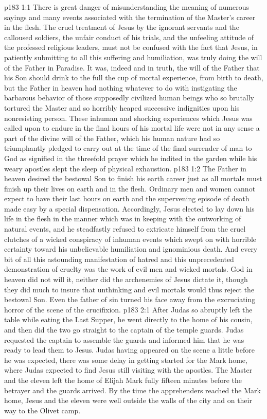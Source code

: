 \vs p183 1:1 There is great danger of misunderstanding the meaning of numerous sayings and many events associated with the termination of the Master’s career in the flesh. The cruel treatment of Jesus by the ignorant servants and the calloused soldiers, the unfair conduct of his trials, and the unfeeling attitude of the professed religious leaders, must not be confused with the fact that Jesus, in patiently submitting to all this suffering and humiliation, was truly doing the will of the Father in Paradise. It was, indeed and in truth, the will of the Father that his Son should drink to the full the cup of mortal experience, from birth to death, but the Father in heaven had nothing whatever to do with instigating the barbarous behavior of those supposedly civilized human beings who so brutally tortured the Master and so horribly heaped successive indignities upon his nonresisting person. These inhuman and shocking experiences which Jesus was called upon to endure in the final hours of his mortal life were not in any sense a part of the divine will of the Father, which his human nature had so triumphantly pledged to carry out at the time of the final surrender of man to God as signified in the threefold prayer which he indited in the garden while his weary apostles slept the sleep of physical exhaustion.
\vs p183 1:2 The Father in heaven desired the bestowal Son to finish his earth career  just as all mortals must finish up their lives on earth and in the flesh. Ordinary men and women cannot expect to have their last hours on earth and the supervening episode of death made easy by a special dispensation. Accordingly, Jesus elected to lay down his life in the flesh in the manner which was in keeping with the outworking of natural events, and he steadfastly refused to extricate himself from the cruel clutches of a wicked conspiracy of inhuman events which swept on with horrible certainty toward his unbelievable humiliation and ignominious death. And every bit of all this astounding manifestation of hatred and this unprecedented demonstration of cruelty was the work of evil men and wicked mortals. God in heaven did not will it, neither did the archenemies of Jesus dictate it, though they did much to insure that unthinking and evil mortals would thus reject the bestowal Son. Even the father of sin turned his face away from the excruciating horror of the scene of the crucifixion.
\vs p183 2:1 After Judas so abruptly left the table while eating the Last Supper, he went directly to the home of his cousin, and then did the two go straight to the captain of the temple guards. Judas requested the captain to assemble the guards and informed him that he was ready to lead them to Jesus. Judas having appeared on the scene a little before he was expected, there was some delay in getting started for the Mark home, where Judas expected to find Jesus still visiting with the apostles. The Master and the eleven left the home of Elijah Mark fully fifteen minutes before the betrayer and the guards arrived. By the time the apprehenders reached the Mark home, Jesus and the eleven were well outside the walls of the city and on their way to the Olivet camp.
